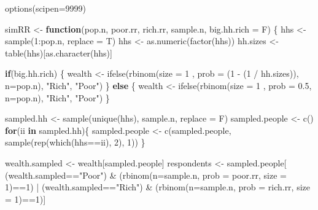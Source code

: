 \documentclass[
]{article}
\newenvironment{Shaded}{\begin{snugshade}}{\end{snugshade}}
\newcommand{\AttributeTok}[1]{\textcolor[rgb]{0.77,0.63,0.00}{#1}}
\newcommand{\ControlFlowTok}[1]{\textcolor[rgb]{0.13,0.29,0.53}{\textbf{#1}}}
\newcommand{\DecValTok}[1]{\textcolor[rgb]{0.00,0.00,0.81}{#1}}
\newcommand{\FloatTok}[1]{\textcolor[rgb]{0.00,0.00,0.81}{#1}}
\newcommand{\FunctionTok}[1]{\textcolor[rgb]{0.00,0.00,0.00}{#1}}
\newcommand{\NormalTok}[1]{#1}
\newcommand{\OtherTok}[1]{\textcolor[rgb]{0.56,0.35,0.01}{#1}}
\newcommand{\SpecialCharTok}[1]{\textcolor[rgb]{0.00,0.00,0.00}{#1}}
\newcommand{\StringTok}[1]{\textcolor[rgb]{0.31,0.60,0.02}{#1}}
\begin{document}
\begin{Shaded}
\begin{Highlighting}[]
\FunctionTok{options}\NormalTok{(}\AttributeTok{scipen=}\DecValTok{9999}\NormalTok{)}


\NormalTok{simRR }\OtherTok{\textless{}{-}} \ControlFlowTok{function}\NormalTok{(pop.n, poor.rr, rich.rr, sample.n, }\AttributeTok{big.hh.rich =}\NormalTok{ F) \{}
\NormalTok{  hhs }\OtherTok{\textless{}{-}} \FunctionTok{sample}\NormalTok{(}\DecValTok{1}\SpecialCharTok{:}\NormalTok{pop.n, }\AttributeTok{replace =}\NormalTok{ T)}
\NormalTok{  hhs }\OtherTok{\textless{}{-}} \FunctionTok{as.numeric}\NormalTok{(}\FunctionTok{factor}\NormalTok{(hhs))}
\NormalTok{  hh.sizes }\OtherTok{\textless{}{-}} \FunctionTok{table}\NormalTok{(hhs)[}\FunctionTok{as.character}\NormalTok{(hhs)]}
  
  \ControlFlowTok{if}\NormalTok{(big.hh.rich) \{}
\NormalTok{    wealth }\OtherTok{\textless{}{-}} \FunctionTok{ifelse}\NormalTok{(}\FunctionTok{rbinom}\NormalTok{(}\AttributeTok{size =} \DecValTok{1}\NormalTok{ , }\AttributeTok{prob =}\NormalTok{ (}\DecValTok{1} \SpecialCharTok{{-}}\NormalTok{ (}\DecValTok{1} \SpecialCharTok{/}\NormalTok{ hh.sizes)), }\AttributeTok{n=}\NormalTok{pop.n), }\StringTok{"Rich"}\NormalTok{, }\StringTok{"Poor"}\NormalTok{)}
\NormalTok{  \} }\ControlFlowTok{else}\NormalTok{ \{}
\NormalTok{    wealth }\OtherTok{\textless{}{-}} \FunctionTok{ifelse}\NormalTok{(}\FunctionTok{rbinom}\NormalTok{(}\AttributeTok{size =} \DecValTok{1}\NormalTok{ , }\AttributeTok{prob =} \FloatTok{0.5}\NormalTok{, }\AttributeTok{n=}\NormalTok{pop.n), }\StringTok{"Rich"}\NormalTok{, }\StringTok{"Poor"}\NormalTok{)}
\NormalTok{  \}}
  
  
\NormalTok{  sampled.hh }\OtherTok{\textless{}{-}} \FunctionTok{sample}\NormalTok{(}\FunctionTok{unique}\NormalTok{(hhs), sample.n, }\AttributeTok{replace =}\NormalTok{ F)}
\NormalTok{  sampled.people }\OtherTok{\textless{}{-}} \FunctionTok{c}\NormalTok{()}
  \ControlFlowTok{for}\NormalTok{(ii }\ControlFlowTok{in}\NormalTok{ sampled.hh)\{}
\NormalTok{    sampled.people }\OtherTok{\textless{}{-}} \FunctionTok{c}\NormalTok{(sampled.people, }\FunctionTok{sample}\NormalTok{(}\FunctionTok{rep}\NormalTok{(}\FunctionTok{which}\NormalTok{(hhs}\SpecialCharTok{==}\NormalTok{ii), }\DecValTok{2}\NormalTok{), }\DecValTok{1}\NormalTok{))}
\NormalTok{  \}}
  
\NormalTok{  wealth.sampled }\OtherTok{\textless{}{-}}\NormalTok{ wealth[sampled.people]}
\NormalTok{  respondents }\OtherTok{\textless{}{-}}\NormalTok{ sampled.people[}
\NormalTok{    (wealth.sampled}\SpecialCharTok{==}\StringTok{"Poor"}\NormalTok{) }\SpecialCharTok{\&}\NormalTok{ (}\FunctionTok{rbinom}\NormalTok{(}\AttributeTok{n=}\NormalTok{sample.n, }\AttributeTok{prob =}\NormalTok{ poor.rr, }\AttributeTok{size =} \DecValTok{1}\NormalTok{)}\SpecialCharTok{==}\DecValTok{1}\NormalTok{) }\SpecialCharTok{|} 
\NormalTok{      (wealth.sampled}\SpecialCharTok{==}\StringTok{"Rich"}\NormalTok{) }\SpecialCharTok{\&}\NormalTok{ (}\FunctionTok{rbinom}\NormalTok{(}\AttributeTok{n=}\NormalTok{sample.n, }\AttributeTok{prob =}\NormalTok{ rich.rr, }\AttributeTok{size =} \DecValTok{1}\NormalTok{)}\SpecialCharTok{==}\DecValTok{1}\NormalTok{)]}
  

\end{Highlighting}
\end{Shaded}
\end{document}
